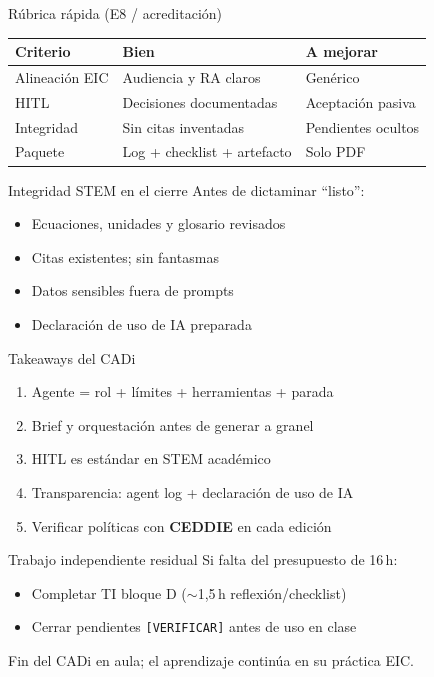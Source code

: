 \documentclass[aspectratio=169,11pt]{beamer}
\begin{document}
\begin{frame}{Rúbrica rápida (E8 / acreditación)}
\begin{tabularx}{\textwidth}{@{}lXX@{}}
\toprule
Criterio & Bien & A mejorar \\
\midrule
Alineación EIC & Audiencia y RA claros & Genérico \\
HITL & Decisiones documentadas & Aceptación pasiva \\
Integridad & Sin citas inventadas & Pendientes ocultos \\
Paquete & Log + checklist + artefacto & Solo PDF \\
\bottomrule
\end{tabularx}
\end{frame}


\begin{frame}{Integridad STEM en el cierre}
Antes de dictaminar ``listo'':
\begin{itemize}
\item[$\square$] Ecuaciones, unidades y glosario revisados
\item[$\square$] Citas existentes; sin fantasmas
\item[$\square$] Datos sensibles fuera de prompts
\item[$\square$] Declaración de uso de IA preparada
\end{itemize}
\end{frame}

\begin{frame}{Takeaways del CADi}
\begin{enumerate}
\item Agente = rol + límites + herramientas + parada
\item Brief y orquestación antes de generar a granel
\item HITL es estándar en STEM académico
\item Transparencia: agent log + declaración de uso de IA
\item Verificar políticas con \textbf{CEDDIE} en cada edición
\end{enumerate}
\end{frame}

\begin{frame}{Trabajo independiente residual}
Si falta del presupuesto de 16\,h:
\begin{itemize}
\item Completar TI bloque D ($\sim$1{,}5\,h reflexión/checklist)
\item Cerrar pendientes \texttt{[VERIFICAR]} antes de uso en clase
\end{itemize}
Fin del CADi en aula; el aprendizaje continúa en su práctica EIC.
\end{frame}
\end{document}
